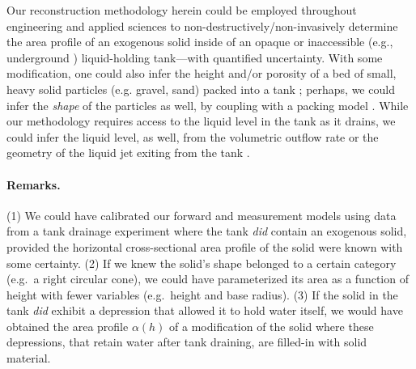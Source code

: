 \documentclass[a4paper,fleqn]{cas-dc}
\begin{document}
Our reconstruction methodology herein could be employed throughout engineering and applied sciences to non-destructively/non-invasively determine the area profile of an exogenous solid inside of an opaque or inaccessible (e.g., underground \cite{gephart2010short}) liquid-holding tank---with quantified uncertainty.
With some modification, one could also infer the height and/or porosity of a bed of small, heavy solid particles (e.g. gravel, sand) packed into a tank \cite{guellouz2020estimation}; perhaps, we could infer the \emph{shape} of the particles as well, by coupling with a packing model \cite{zhang2006relationship}. 
While our methodology requires access to the liquid level in the tank as it drains, we could infer the liquid level, as well, from the volumetric outflow rate or the geometry of the liquid jet exiting from the tank \cite{groetsch1999inverse,davidovic2020visualizing}.


\paragraph{Remarks.} (1) We could have calibrated our forward and measurement models using data from a tank drainage experiment where the tank \emph{did} contain an exogenous solid, provided the horizontal cross-sectional area profile of the solid were known with some certainty. (2) If we knew the solid's shape belonged to a certain category (e.g.\ a right circular cone), we could have parameterized its area as a function of height with fewer variables (e.g.\ height and base radius). (3) If the solid in the tank \emph{did} exhibit a depression that allowed it to hold water itself, we would have obtained the area profile $\alpha(h)$ of a modification of the solid where these depressions, that retain water after tank draining, are filled-in with solid material.
\end{document}
